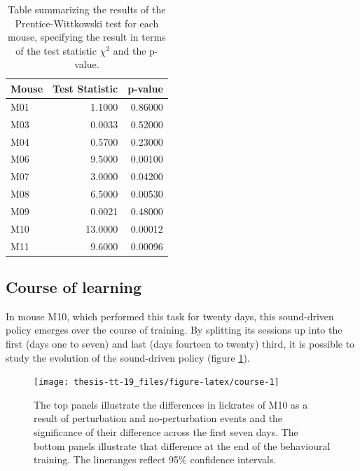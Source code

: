 \documentclass[]{report}
\theoremstyle{definition}
\theoremstyle{definition}
\theoremstyle{definition}
\theoremstyle{remark}
\begin{document}
\begin{table}[t]

\caption{\label{tab:significance}Table summarizing the results of the
Prentice-Wittkowski test for each mouse, specifying the result in terms
of the test statistic \(\chi^2\) and the p-value.}
\centering
\begin{tabular}{lrr}
\toprule
Mouse & Test Statistic & p-value\\
\midrule
M01 & 1.1000 & 0.86000\\
M03 & 0.0033 & 0.52000\\
M04 & 0.5700 & 0.23000\\
M06 & 9.5000 & 0.00100\\
M07 & 3.0000 & 0.04200\\
\addlinespace
M08 & 6.5000 & 0.00530\\
M09 & 0.0021 & 0.48000\\
M10 & 13.0000 & 0.00012\\
M11 & 9.6000 & 0.00096\\
\bottomrule
\end{tabular}
\end{table}





\hypertarget{course-of-learning}{%
\subsection{Course of learning}\label{course-of-learning}}

In mouse M10, which performed this task for twenty days, this
sound-driven policy emerges over the course of training. By splitting
its sessions up into the first (days one to seven) and last (days
fourteen to twenty) third, it is possible to study the evolution of the
sound-driven policy (figure \ref{fig:course}).

\begin{figure}

{\centering \texttt{[image: thesis-tt-19\_files/figure-latex/course-1]} 

}

\caption{The top panels illustrate the differences in lickrates of
M10 as a result of perturbation and no-perturbation events and the
significance of their difference across the first seven days. The bottom
panels illustrate that difference at the end of the behavioural
training. The lineranges reflect 95\% confidence intervals.}\label{fig:course}
\end{figure}
\end{document}
